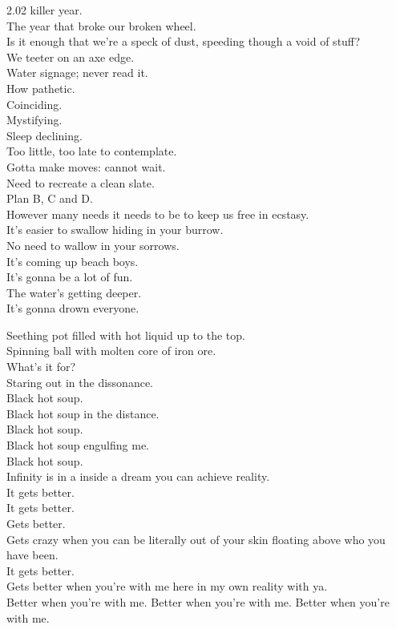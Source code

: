 2.02 killer year. \\
The year that broke our broken wheel. \\
Is it enough that we're a speck of dust, speeding though a void of stuff? \\
We teeter on an axe edge. \\

Water signage; never read it. \\
How pathetic. \\
Coinciding. \\
Mystifying. \\
Sleep declining. \\
Too little, too late to contemplate. \\
Gotta make moves: cannot wait. \\
Need to recreate a clean slate. \\
Plan B, C and D. \\
However many needs it needs to be to keep us free in ecstasy. \\
It's easier to swallow hiding in your burrow. \\
No need to wallow in your sorrows. \\

It's coming up beach boys. \\
It's gonna be a lot of fun. \\
The water's getting deeper. \\
It's gonna drown everyone. \\




Seething pot filled with hot liquid up to the top. \\
Spinning ball with molten core of iron ore. \\
What's it for? \\

Staring out in the dissonance. \\
Black hot soup. \\
Black hot soup in the distance. \\
Black hot soup. \\
Black hot soup engulfing me. \\
Black hot soup. \\

Infinity is in a  inside a dream you can achieve reality. \\
It gets better. \\
It gets better. \\
Gets better. \\
Gets crazy when you can be literally out of your skin floating above who you have been. \\
It gets better. \\
Gets better when you're with me here in my own reality with ya. \\
Better when you're with me. Better when you're with me. Better when you're with me. \\

